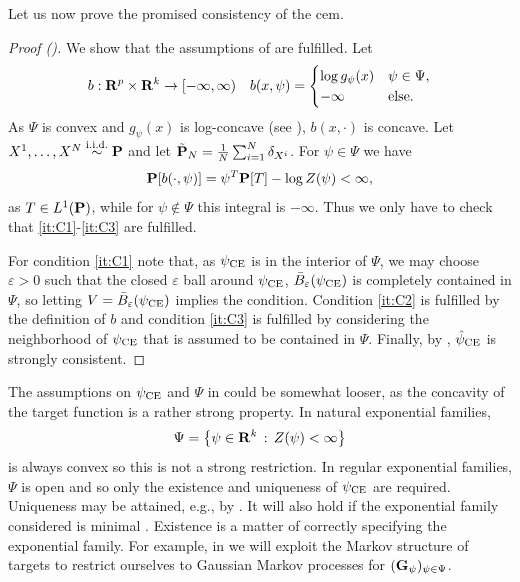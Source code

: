 Let us now prove the promised consistency of the \gls{cem}.
\begin{proof}[Proof ()]
    We show that the assumptions of  are fulfilled. Let
    \begin{align*}
        b: \R^{p}\times \R^{k} \to [-\infty, \infty) && b(x, \psi) = \begin{cases}
            \log g_{\psi}(x) & \psi \in \Psi, \\
            - \infty & \text{else.}
        \end{cases} 
    \end{align*}
    As $\Psi$ is convex and $g_{\psi}(x)$ is log-concave (see ), $b(x, \cdot)$ is concave. Let $X^{1}, \dots, X^{N} \iid \P$ and let $\tilde{\P}_{N} = \frac{1}{N} \sum_{i = 1}^N \delta_{X^{i}}$. For $\psi \in \Psi$ we have
    $$
    \P [b(\cdot, \psi)] = \psi^{T}\P[T] - \log Z(\psi) < \infty,
    $$
    as $T \in L^{1}(\P)$, while for $\psi \notin \Psi$ this integral is $-\infty$. Thus we only have to check that \ref{it:C1}-\ref{it:C3} are fulfilled. 
    
    For condition \ref{it:C1} note that, as $\pce$ is in the interior of $\Psi$, we may choose $\varepsilon > 0$ such that the closed $\varepsilon$ ball around $\pce$, $\bar B_{\varepsilon} (\pce)$ is completely contained in $\Psi$, so letting $V = \bar B_{\varepsilon} (\pce)$ implies the condition. Condition \ref{it:C2} is fulfilled by the definition of $b$ and condition \ref{it:C3} is fulfilled by considering the neighborhood of $\pce$ that is assumed to be contained in $\Psi$. Finally, by , $\hpce$ is strongly consistent.
\end{proof}

The assumptions on $\pce$ and $\Psi$ in  could be somewhat looser, as the concavity of the target function is a rather strong property. In natural exponential families, 
$$
\Psi = \left\{ \psi \in \R^{k} \,:\, Z(\psi) < \infty \right\}
$$
is always convex so this is not a strong restriction. In regular exponential families, $\Psi$ is open and so only the existence and uniqueness of $\pce$ are required. Uniqueness may be attained, e.g., by . It will also hold if the exponential family considered is minimal \citep[Corollary 2.5]{Brown1986Fundamentals}. Existence is a matter of correctly specifying the exponential family. For example, in  we will exploit the Markov structure of targets to restrict ourselves to Gaussian Markov processes for $(\G_{\psi})_{\psi \in \Psi}$. 

